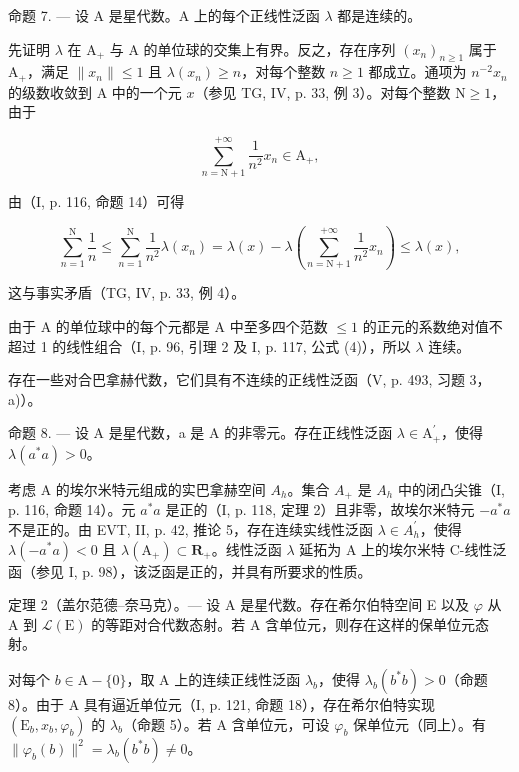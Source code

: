 命题 7. --- 设 A 是星代数。A 上的每个正线性泛函 \(\lambda\) 都是连续的。

先证明 \(\lambda\) 在 \(\mathrm{A}_{+}\) 与 A 的单位球的交集上有界。反之，存在序列 \((x_{n})_{n\geqslant 1}\) 属于 \(\mathrm{A}_{+}\)，满足 \(\| x_n\| \leqslant 1\) 且 \(\lambda (x_n)\geqslant n\)，对每个整数 \(n\geqslant 1\) 都成立。通项为 \(n^{-2}x_{n}\) 的级数收敛到 A 中的一个元 \(x\)（参见 TG, IV, p. 33, 例 3）。对每个整数 \(\mathrm{N}\geqslant 1\)，由于

\[
\sum_ {n = \mathrm{N} + 1} ^ {+ \infty} \frac {1}{n ^ {2}} x _ {n} \in \mathrm{A} _ {+},
\]

由（I, p. 116, 命题 14）可得

\[
\sum_ {n = 1} ^ {\mathrm{N}} \frac {1}{n} \leqslant \sum_ {n = 1} ^ {\mathrm{N}} \frac {1}{n ^ {2}} \lambda (x _ {n}) = \lambda (x) - \lambda \left(\sum_ {n = \mathrm{N} + 1} ^ {+ \infty} \frac {1}{n ^ {2}} x _ {n}\right) \leqslant \lambda (x),
\]

这与事实矛盾（TG, IV, p. 33, 例 4）。

由于 A 的单位球中的每个元都是 A 中至多四个范数 \(\leqslant 1\) 的正元的系数绝对值不超过 1 的线性组合（I, p. 96, 引理 2 及 I, p. 117, 公式 (4)），所以 \(\lambda\) 连续。

存在一些对合巴拿赫代数，它们具有不连续的正线性泛函（V, p. 493, 习题 3，a)）。

命题 8. --- 设 A 是星代数，a 是 A 的非零元。存在正线性泛函 \(\lambda \in \mathrm{A}_{+}^{\prime}\)，使得 \(\lambda(a^{*}a) > 0\)。

考虑 A 的埃尔米特元组成的实巴拿赫空间 \(A_{h}\)。集合 \(A_{+}\) 是 \(A_{h}\) 中的闭凸尖锥（I, p. 116, 命题 14）。元 \(a^{*}a\) 是正的（I, p. 118, 定理 2）且非零，故埃尔米特元 \(-a^{*}a\) 不是正的。由 EVT, II, p. 42, 推论 5，存在连续实线性泛函 \(\lambda\in A_{h}^{\prime}\)，使得 \(\lambda(-a^{*}a)<0\) 且 \(\lambda(\mathrm{A}_{+})\subset\mathbf{R}_{+}\)。线性泛函 \(\lambda\) 延拓为 A 上的埃尔米特 C-线性泛函（参见 I, p. 98），该泛函是正的，并具有所要求的性质。

定理 2（盖尔范德--奈马克）。--- 设 A 是星代数。存在希尔伯特空间 E 以及 \(\varphi\) 从 A 到 \(\mathcal{L}(\mathrm{E})\) 的等距对合代数态射。若 A 含单位元，则存在这样的保单位元态射。

对每个 \(b \in \mathrm{A} - \{0\}\)，取 A 上的连续正线性泛函 \(\lambda_b\)，使得 \(\lambda_b(b^*b) > 0\)（命题 8）。由于 A 具有逼近单位元（I, p. 121, 命题 18），存在希尔伯特实现 \((\mathrm{E}_b, x_b, \varphi_b)\) 的 \(\lambda_b\)（命题 5）。若 A 含单位元，可设 \(\varphi_b\) 保单位元（同上）。有 \(\| \varphi_b(b) \|^2 = \lambda_b(b^*b) \neq 0\)。

